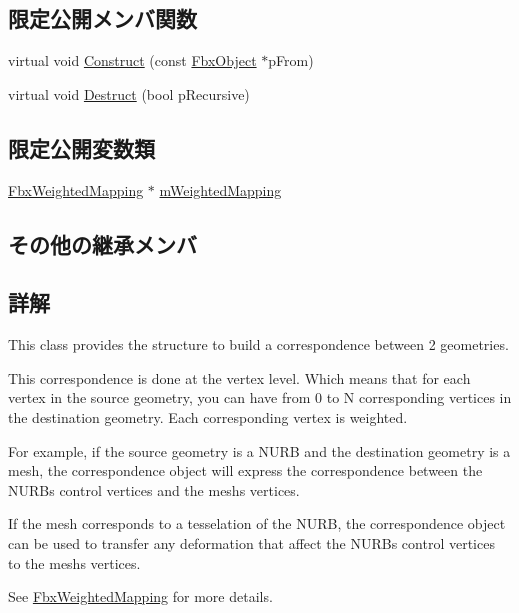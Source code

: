 \subsection*{限定公開メンバ関数}
\begin{DoxyCompactItemize}
\item 
virtual void \hyperlink{class_fbx_geometry_weighted_map_af8485ac8574bf4ac9222de920a98e81f}{Construct} (const \hyperlink{class_fbx_object}{Fbx\+Object} $\ast$p\+From)
\item 
virtual void \hyperlink{class_fbx_geometry_weighted_map_a638d84bf777db4a17d63505f62d9f22f}{Destruct} (bool p\+Recursive)
\end{DoxyCompactItemize}
\subsection*{限定公開変数類}
\begin{DoxyCompactItemize}
\item 
\hyperlink{class_fbx_weighted_mapping}{Fbx\+Weighted\+Mapping} $\ast$ \hyperlink{class_fbx_geometry_weighted_map_a2d36d5ffef5895fb3faa75378884b32d}{m\+Weighted\+Mapping}
\end{DoxyCompactItemize}
\subsection*{その他の継承メンバ}


\subsection{詳解}
This class provides the structure to build a correspondence between 2 geometries. 

This correspondence is done at the vertex level. Which means that for each vertex in the source geometry, you can have from 0 to N corresponding vertices in the destination geometry. Each corresponding vertex is weighted.

For example, if the source geometry is a N\+U\+RB and the destination geometry is a mesh, the correspondence object will express the correspondence between the N\+U\+RB\textquotesingle{}s control vertices and the mesh\textquotesingle{}s vertices.

If the mesh corresponds to a tesselation of the N\+U\+RB, the correspondence object can be used to transfer any deformation that affect the N\+U\+RB\textquotesingle{}s control vertices to the mesh\textquotesingle{}s vertices.

See \hyperlink{class_fbx_weighted_mapping}{Fbx\+Weighted\+Mapping} for more details. 

